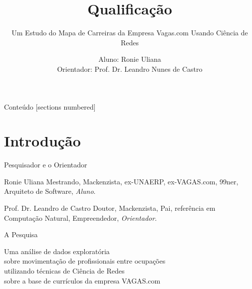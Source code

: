 \documentclass[10pt, hyperref={pdfpagelabels=false, unicode=true}, aspectratio=169]{beamer}
\title{Qualificação}
\subtitle{Um Estudo do Mapa de Carreiras da Empresa Vagas.com Usando Ciência de Redes}
\date{}
\author{Aluno: Ronie Uliana \\ Orientador: Prof. Dr. Leandro Nunes de Castro}
\institute{Universidade Presbiteriana Mackenzie}
\begin{document}
\maketitle

\begin{frame}{Conteúdo}
  [sections numbered]
  \tableofcontents[hideallsubsections]
\end{frame}

\section{Introdução}

\begin{frame}[fragile, label=pessoas]{Pesquisador e o Orientador}

  \begin{alertblock}{Ronie Uliana}
    Mestrando, Mackenzista, ex-UNAERP, ex-VAGAS.com, 99ner, Arquiteto de Software, \textit{Aluno}.
  \end{alertblock}
  
  \begin{alertblock}{Prof. Dr. Leandro de Castro}
    Doutor, Mackenzista, Pai, referência em Computação Natural, Empreendedor, \textit{Orientador}.
  \end{alertblock}
\end{frame}

\begin{frame}[fragile, label=pesquisa]{A Pesquisa}
  \begin{center}
    \large
    Uma \alert{análise de dados exploratória}\\
    sobre movimentação de profissionais entre ocupações\\
    utilizando técnicas de \alert{Ciência de Redes}\\
    sobre a base de currículos da empresa VAGAS.com
  \end{center}
\end{frame}
\end{document}
